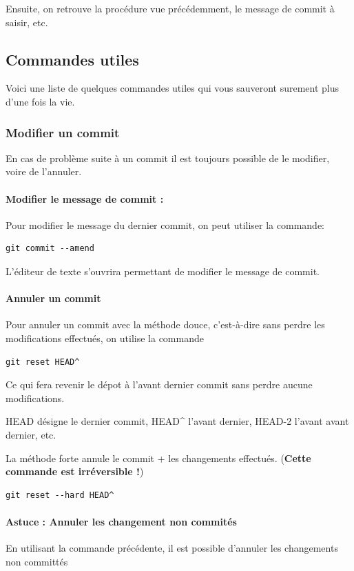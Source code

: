 \documentclass[a4paper]{article}
\begin{document}
Ensuite, on retrouve la procédure vue précédemment, le message de commit à saisir, etc.

\subsection{Commandes utiles}

Voici une liste de quelques commandes utiles qui vous sauveront surement plus d'une fois la vie.

\subsubsection{Modifier un commit}

En cas de problème suite à un commit il est toujours possible de le modifier, voire de l'annuler.

\paragraph{Modifier le message de commit :}Pour modifier le message du dernier commit, on peut utiliser la commande:
\begin{verbatim}
git commit --amend
\end{verbatim}
L'éditeur de texte s'ouvrira permettant de modifier le message de commit.

\paragraph{Annuler un commit}Pour annuler un commit avec la méthode douce, c'est-à-dire sans perdre les modifications effectués, on utilise la commande

\begin{verbatim}
git reset HEAD^
\end{verbatim}
Ce qui fera revenir le dépot à l'avant dernier commit sans perdre aucune modifications.

HEAD désigne le dernier commit, HEAD\^{} l'avant dernier, HEAD-2 l'avant avant dernier, etc.

La méthode forte annule le commit + les changements effectués. (\textbf{Cette commande est irréversible !})

\begin{verbatim}
git reset --hard HEAD^
\end{verbatim}

\paragraph{Astuce : Annuler les changement non commités} En utilisant la commande précédente, il est possible d'annuler les changements non committés
\end{document}
